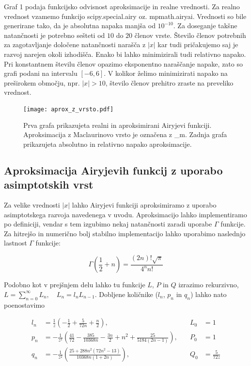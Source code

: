 \documentclass[12pt, a4paper]{article}
\begin{document}
Graf 1 podaja funkcijsko odvisnost aproksimacije in realne vrednosti. Za realno vrednost
vzamemo funkcijo {\sc scipy.special.airy} oz. {\sc mpmath.airyai}. Vrednosti so bile generirane
tako, da je absolutna napaka manjša od $10^{-10}$. Za doseganje takšne natančnosti je potrebno sešteti
od $10$ do $20$ členov vrste. Število členov potrebnih za zagotavljanje določene natančnosti narašča z $|x|$ 
kar tudi pričakujemo saj je razvoj narejen okoli izhodišča. Enako bi lahko minimizirali tudi relativno napako.
Pri konstantnem številu členov opazimo eksponentno naraščanje napake, zato so grafi podani na intervalu $[-6, 6]$. V kolikor želimo minimizirati napako na preširokem območju, npr. $|x|>10$, število členov prehitro zraste na preveliko vrednost.

\begin{figure}[hbtp]
  \begin{center}
  \texttt{[image: aprox\_z\_vrsto.pdf]}
  \end{center}
  \vspace*{-7mm}
  \caption{Prva grafa prikazujeta realni in aproksimirani Airyjevi funkciji. Aproksimacija z Maclaurinovo vrsto je označena z \_m. Zadnja grafa prikazujeta absolutno in relativno napako aproksimacije.}
\end{figure}


\subsection{Aproksimacija Airyjevih funkcij z uporabo asimptotskih vrst}

Za velike vrednosti $|x|$ lahko Airyjevi funkciji aproksimiramo z uporabo asimptotskega razvoja navedenega v uvodu.
Aproksimacijo lahko implementiramo po definiciji, vendar s tem izgubimo nekaj natančnosti 
zaradi uporabe $\Gamma$ funkcije. Za hitrejšo in numerično bolj stabilno implementacijo
lahko uporabimo naslednjo lastnost $\Gamma$ funkcije:

\begin{equation*}
  \Gamma \left(\frac{1}{2}+n\right) = \frac{(2n)!\sqrt{\pi}}{4^n n!}
\end{equation*}

Podobno kot v prejšnjem delu lahko tu funkcije $L$, $P$ in $Q$ izrazimo rekurzivno, $L = \sum_{n=0}^{\infty} L_n , \quad L_n = l_n L_{n-1}$. Dobljene količnike ($l_n$, $p_n$ in $q_n$) lahko nato poenostavimo

\begin{align*}
  l_n &= \frac{1}{z}\left(-\frac{1}{2}+\frac{5}{72n}+\frac{n}{2}\right),\quad &L_0 &= 1 \\
  p_n &= -\frac{1}{z^2}\left(\frac{41}{72}-\frac{385}{10368n}-\frac{3n}{2}+n^2+\frac{25}{5184(2n-1)}\right),\quad &P_0 &= 1 \\
  q_n &= -\frac{1}{z^2}\left(\frac{25+288n^2(72n^2-13)}{10368n(1+2n)}\right),\quad &Q_0 &= \frac{5}{72z}
\end{align*}
\end{document}

